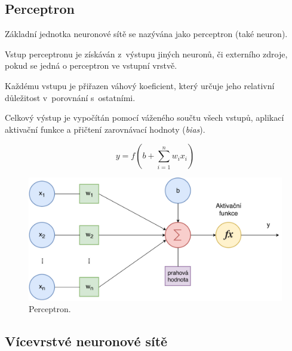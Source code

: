 \subsection{Perceptron}

\begin{compactitem}
    \item Základní jednotka neuronové sítě se nazývána jako perceptron (také neuron).

    \item Vstup perceptronu je získáván z~výstupu jiných neuronů, či externího zdroje, pokud se jedná o perceptron ve vstupní vrstvě.

    \item Každému vstupu je přiřazen váhový koeficient, který určuje jeho relativní důležitost v~porovnání s~ostatními.

    \item Celkový výstup je vypočítán pomocí váženého součtu všech vstupů, aplikací aktivační funkce a přičtení zarovnávací hodnoty (\textit{bias}).

    \begin{equation}
        y=f(b + \sum_{i = 1}^{n} w_i x_i)
    \end{equation}
\end{compactitem}

\begin{figure}[H]
    \centering
    \includegraphics[width=0.7\linewidth]{perceptron.pdf}
    \caption{Perceptron.}
\end{figure}

\subsection{Vícevrstvé neuronové sítě}

